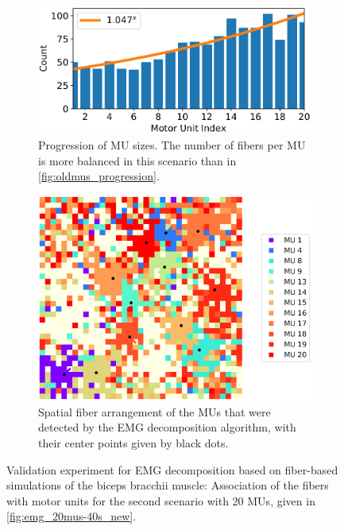 \begin{figure}
  \centering%
  \begin{subfigure}[t]{0.45\textwidth}%
    \centering%
    \includegraphics[width=\textwidth]{images/results/application/newmus1.pdf}%
    \caption{Progression of MU sizes. The number of fibers per MU is more balanced in this scenario than in \cref{fig:oldmus_progression}.}%
    \label{fig:newmus_progression}%
  \end{subfigure}\hfill
  \begin{subfigure}[t]{0.45\textwidth}%
    \centering%
    \includegraphics[width=\textwidth]{images/results/application/newmus3.pdf}%
    \caption{Spatial fiber arrangement of the MUs that were detected by the EMG decomposition algorithm, with their center points given by black dots.}%
    \label{fig:newmus_2d}%
  \end{subfigure} 
  \caption{Validation experiment for EMG decomposition based on fiber-based simulations of the biceps bracchii muscle: Association of the fibers with motor units for the second scenario with 20 MUs, given in \cref{fig:emg_20mus-40s_new}.}%
  \label{fig:newmus}%
\end{figure}

